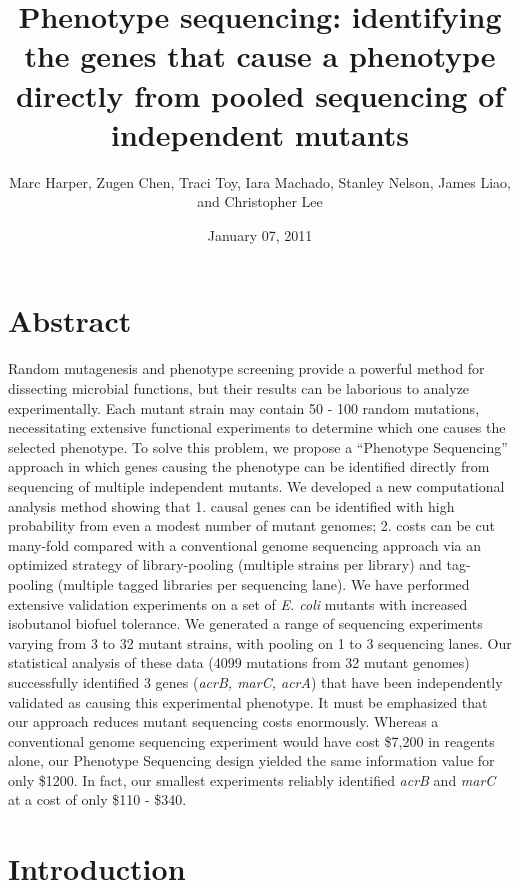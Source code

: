 \documentclass[letterpaper,10pt,english]{howto}
\title{Phenotype sequencing: identifying the genes that cause a phenotype directly from pooled sequencing of independent mutants}
\date{January 07, 2011}
\author{Marc Harper, Zugen Chen, Traci Toy, Iara Machado, Stanley Nelson, James Liao, and Christopher Lee}
\begin{document}
\maketitle
\tableofcontents
\hypertarget{--doc-multihit}{}



\section{Abstract}

Random mutagenesis and phenotype screening provide a powerful method
for dissecting microbial functions, but their results can be
laborious to analyze experimentally.  Each mutant strain may contain
50 - 100 random mutations, necessitating extensive functional
experiments to determine which one causes the selected phenotype.  To
solve this problem, we propose a ``Phenotype Sequencing'' approach in
which genes causing the phenotype can be identified directly from
sequencing of multiple independent mutants.  We developed a new
computational analysis method showing that 1. causal genes can be
identified with high probability from even a modest number of mutant
genomes; 2. costs can be cut many-fold compared with a conventional
genome sequencing approach via an optimized strategy of library-pooling
(multiple strains per library) and tag-pooling (multiple
tagged libraries per sequencing lane).   We have performed extensive
validation experiments on a set of \emph{E. coli} mutants with increased
isobutanol biofuel tolerance.  We generated a range of sequencing
experiments varying from 3 to 32 mutant strains, with pooling on 1 to
3 sequencing lanes. Our statistical analysis of these data (4099
mutations from 32 mutant genomes) successfully identified 3 genes
(\emph{acrB, marC, acrA}) that have been independently validated as causing
this experimental phenotype.  It must be emphasized that our approach
reduces mutant sequencing costs enormously.  Whereas a conventional
genome sequencing experiment would have cost \$7,200 in reagents
alone, our Phenotype Sequencing design yielded the same information
value for only \$1200.  In fact, our smallest experiments reliably
identified \emph{acrB} and \emph{marC} at a cost of only \$110 - \$340.


\section{Introduction}
\end{document}
